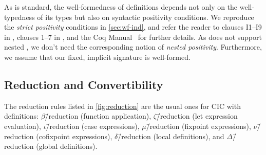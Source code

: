 As is standard, the well-formedness of \coinductive definitions depends not only on the well-typedness of its types but also on syntactic positivity conditions.
We reproduce the \textit{strict positivity} conditions in \autoref{sec:wf-ind}, and refer the reader to clauses I1--I9 in \citet{cic-hat-minus}, clauses 1--7 in \mbox{\citet{cic-hat}}, and the Coq Manual~\citep{coq} for further details.
As \lang does not support nested \coinductives,
we don't need the corresponding notion of \textit{nested positivity}.
Furthermore, we assume that our fixed, implicit signature is well-formed.

\iffalse
\subsubsection{Metafunctions and Metarelations}

We declare the following metafunctions, whose definitions are straightforward:

\begin{itemize}
    \item $\FV{\ph}, \SV{\ph}$ return the set of free term and size variables in a given term or environment, respectively;
    \item $\floor{\ph}$ returns the size variable a given finite (\ie not $\infty$) size expression;
    \item $\norm{\ph}$ returns the cardinality of its argument (\eg sequence length, set size, \etc);
    \item $\erase{\ph}$ erases sized terms to bare terms; and
    \item $\erase{\ph}^\upsilon$ replaces size annotations with size variable $\upsilon$ by $*$ and removes all other ones.
\end{itemize}

Note that the free size variables of a size substition $\rho$ are only those of the sizes that $\rho$ maps \emph{to}.
\fi

\subsection{Reduction and Convertibility}

The reduction rules listed in \autoref{fig:reduction} are the usual ones for CIC with definitions:
$\beta$\=/reduction (function application),
$\zeta$\=/reduction (let expression evaluation),
$\iota$\=/reduction (case expressions),
$\mu$\=/reduction (fixpoint expressions),
$\nu$\=/reduction (cofixpoint expressions),
$\delta$\=/reduction (local definitions), and
$\Delta$\=/reduction (global definitions).

